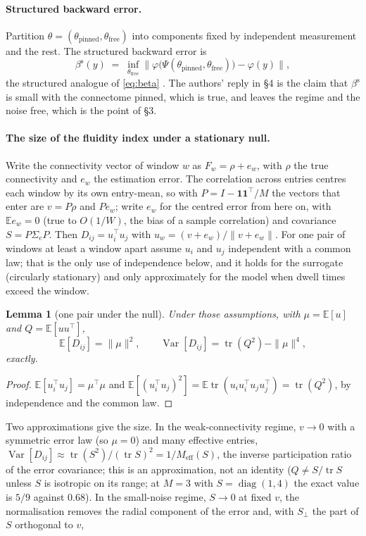 \documentclass[11pt]{article}
\newtheorem{lemma}{Lemma}
\begin{document}
\paragraph{Structured backward error.} Partition $\theta=(\theta_{\mathrm{pinned}},\theta_{\mathrm{free}})$ into components fixed by independent measurement and the rest. The structured backward error is
\[
\beta^{\mathrm{s}}(y)\;=\;\inf_{\theta_{\mathrm{free}}}\bigl\|\varphi\bigl(\Psi(\theta_{\mathrm{pinned}},\theta_{\mathrm{free}})\bigr)-\varphi(y)\bigr\| ,
\]
the structured analogue of \eqref{eq:beta} \parencite{highamhigham1992}. The authors' reply in \S4 is the claim that $\beta^{\mathrm{s}}$ is small with the connectome pinned, which is true, and leaves the regime and the noise free, which is the point of \S3.

\paragraph{The size of the fluidity index under a stationary null.} Write the connectivity vector of window $w$ as $F_w=\rho+e_w$, with $\rho$ the true connectivity and $e_w$ the estimation error. The correlation across entries centres each window by its own entry-mean, so with $P=I-\mathbf{1}\mathbf{1}^{\top}/M$ the vectors that enter are $v=P\rho$ and $Pe_w$; write $e_w$ for the centred error from here on, with $\mathbb{E}e_w=0$ (true to $O(1/W)$, the bias of a sample correlation) and covariance $S=P\Sigma_eP$. Then $D_{ij}=u_i^{\top}u_j$ with $u_w=(v+e_w)/\|v+e_w\|$. For one pair of windows at least a window apart assume $u_i$ and $u_j$ independent with a common law; that is the only use of independence below, and it holds for the surrogate (circularly stationary) and only approximately for the model when dwell times exceed the window.
\begin{lemma}[one pair under the null]\label{lem:floor}
Under those assumptions, with $\mu=\mathbb{E}[u]$ and $Q=\mathbb{E}[uu^{\top}]$,
\[
\mathbb{E}[D_{ij}]=\|\mu\|^{2},\qquad \operatorname{Var}[D_{ij}]=\operatorname{tr}(Q^{2})-\|\mu\|^{4},
\]
exactly.
\end{lemma}
\begin{proof}
$\mathbb{E}[u_i^{\top}u_j]=\mu^{\top}\mu$ and $\mathbb{E}[(u_i^{\top}u_j)^{2}]=\mathbb{E}\operatorname{tr}(u_iu_i^{\top}u_ju_j^{\top})=\operatorname{tr}(Q^{2})$, by independence and the common law.
\end{proof}
Two approximations give the size. In the weak-connectivity regime, $v\to0$ with a symmetric error law (so $\mu=0$) and many effective entries, $\operatorname{Var}[D_{ij}]\approx\operatorname{tr}(S^{2})/(\operatorname{tr}S)^{2}=1/M_{\mathrm{eff}}(S)$, the inverse participation ratio of the error covariance; this is an approximation, not an identity ($Q\ne S/\operatorname{tr}S$ unless $S$ is isotropic on its range; at $M=3$ with $S=\operatorname{diag}(1,4)$ the exact value is $5/9$ against $0.68$). In the small-noise regime, $S\to0$ at fixed $v$, the normalisation removes the radial component of the error and, with $S_\perp$ the part of $S$ orthogonal to $v$,
\end{document}
